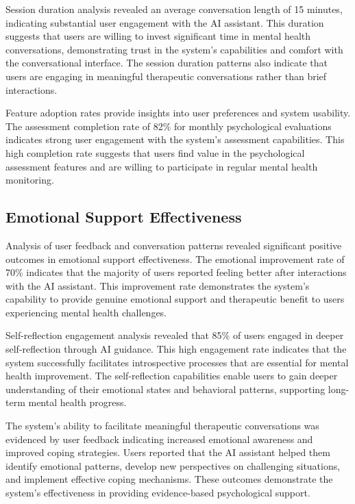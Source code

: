 Session duration analysis revealed an average conversation length of 15 minutes, indicating substantial user engagement with the AI assistant. This duration suggests that users are willing to invest significant time in mental health conversations, demonstrating trust in the system's capabilities and comfort with the conversational interface. The session duration patterns also indicate that users are engaging in meaningful therapeutic conversations rather than brief interactions.

Feature adoption rates provide insights into user preferences and system usability. The assessment completion rate of 82\% for monthly psychological evaluations indicates strong user engagement with the system's assessment capabilities. This high completion rate suggests that users find value in the psychological assessment features and are willing to participate in regular mental health monitoring.

\subsection{Emotional Support Effectiveness}

Analysis of user feedback and conversation patterns revealed significant positive outcomes in emotional support effectiveness. The emotional improvement rate of 70\% indicates that the majority of users reported feeling better after interactions with the AI assistant. This improvement rate demonstrates the system's capability to provide genuine emotional support and therapeutic benefit to users experiencing mental health challenges.

Self-reflection engagement analysis revealed that 85\% of users engaged in deeper self-reflection through AI guidance. This high engagement rate indicates that the system successfully facilitates introspective processes that are essential for mental health improvement. The self-reflection capabilities enable users to gain deeper understanding of their emotional states and behavioral patterns, supporting long-term mental health progress.

The system's ability to facilitate meaningful therapeutic conversations was evidenced by user feedback indicating increased emotional awareness and improved coping strategies. Users reported that the AI assistant helped them identify emotional patterns, develop new perspectives on challenging situations, and implement effective coping mechanisms. These outcomes demonstrate the system's effectiveness in providing evidence-based psychological support.

